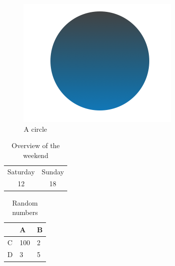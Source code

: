 \documentclass[11pt, letterpaper]{article} %
\begin{document}
\begin{figure}[htpb!] %
    \centering %
\includegraphics[scale=0.8]{figure/figure.png} %
    \caption{A circle} %
    \label{fig:my_label} %
\end{figure}

\blindtext %

\begin{table}[] %
    \centering
    \begin{tabular}{c|c}
        Saturday & Sunday \\
        12 & 18
    \end{tabular}
    \caption{Overview of the weekend}%
    \label{tab:weekend} %
\end{table}

\begin{table}[] %
    \centering
\begin{tabular}{@{}lll@{}}
\toprule
  & A   & B \\ \midrule
C & 100 & 2 \\
D & 3   & 5 \\ \bottomrule
\end{tabular}
    \caption{Random numbers} %
    \label{tab:numbers} %
\end{table}

\end{document}
